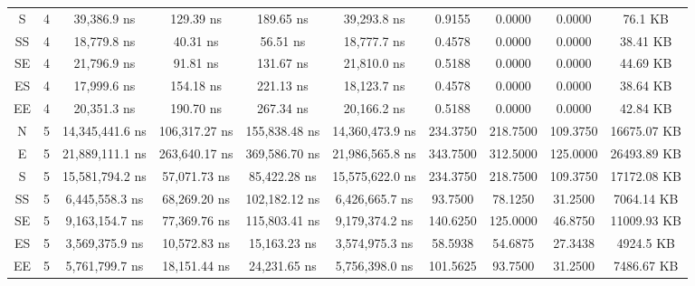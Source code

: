 \begin{sidewaystable}
\begin{tabular}{|c|c|c|c|c|c|c|c|c|c|}
        S       &   4       &   39,386.9 ns           &   129.39 ns         &   189.65 ns             &   39,293.8 ns           &   0.9155      &   0.0000      &   0.0000      &   76.1 KB          \\
        SS      &   4       &   18,779.8 ns           &   40.31 ns          &   56.51 ns              &   18,777.7 ns           &   0.4578      &   0.0000      &   0.0000      &   38.41 KB         \\
        SE      &   4       &   21,796.9 ns           &   91.81 ns          &   131.67 ns             &   21,810.0 ns           &   0.5188      &   0.0000      &   0.0000      &   44.69 KB         \\
        ES      &   4       &   17,999.6 ns           &   154.18 ns         &   221.13 ns             &   18,123.7 ns           &   0.4578      &   0.0000      &   0.0000      &   38.64 KB         \\
        EE      &   4       &   20,351.3 ns           &   190.70 ns         &   267.34 ns             &   20,166.2 ns           &   0.5188      &   0.0000      &   0.0000      &   42.84 KB         \\
        N       &   5       &   14,345,441.6 ns       &   106,317.27 ns     &   155,838.48 ns         &   14,360,473.9 ns       &   234.3750    &   218.7500    &   109.3750    &   16675.07 KB      \\
        E       &   5       &   21,889,111.1 ns       &   263,640.17 ns     &   369,586.70 ns         &   21,986,565.8 ns       &   343.7500    &   312.5000    &   125.0000    &   26493.89 KB      \\
        S       &   5       &   15,581,794.2 ns       &   57,071.73 ns      &   85,422.28 ns          &   15,575,622.0 ns       &   234.3750    &   218.7500    &   109.3750    &   17172.08 KB      \\
        SS      &   5       &   6,445,558.3 ns        &   68,269.20 ns      &   102,182.12 ns         &   6,426,665.7 ns        &   93.7500     &   78.1250     &   31.2500     &   7064.14 KB       \\
        SE      &   5       &   9,163,154.7 ns        &   77,369.76 ns      &   115,803.41 ns         &   9,179,374.2 ns        &   140.6250    &   125.0000    &   46.8750     &   11009.93 KB      \\
        ES      &   5       &   3,569,375.9 ns        &   10,572.83 ns      &   15,163.23 ns          &   3,574,975.3 ns        &   58.5938     &   54.6875     &   27.3438     &   4924.5 KB        \\
        EE      &   5       &   5,761,799.7 ns        &   18,151.44 ns      &   24,231.65 ns          &   5,756,398.0 ns        &   101.5625    &   93.7500     &   31.2500     &   7486.67 KB       \\
        \hline
    \end{tabular}
\end{sidewaystable}
